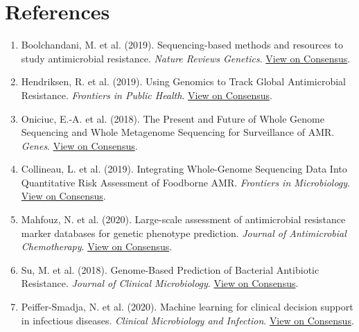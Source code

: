 \documentclass[11pt, letterpaper]{article}
\begin{document}
\section*{References}

\begin{enumerate}[leftmargin=*]
    \item \label{boolchandani2019} Boolchandani, M. et al. (2019). Sequencing-based methods and resources to study antimicrobial resistance. \textit{Nature Reviews Genetics}. \href{https://consensus.app/papers/details/435fbf72968c509e9a860a6c87d62175/?utm_source=unknown}{View on Consensus}.
    \item \label{hendriksen2019} Hendriksen, R. et al. (2019). Using Genomics to Track Global Antimicrobial Resistance. \textit{Frontiers in Public Health}. \href{https://consensus.app/papers/details/63ca2e3f2d9351809e2a67a5125cb606/?utm_source=unknown}{View on Consensus}.
    \item \label{oniciuc2018} Oniciuc, E.-A. et al. (2018). The Present and Future of Whole Genome Sequencing and Whole Metagenome Sequencing for Surveillance of AMR. \textit{Genes}. \href{https://consensus.app/papers/details/05f276609d5255abb0f4d6afd48851b5/?utm_source=unknown}{View on Consensus}.
    \item \label{collineau2019} Collineau, L. et al. (2019). Integrating Whole-Genome Sequencing Data Into Quantitative Risk Assessment of Foodborne AMR. \textit{Frontiers in Microbiology}. \href{https://consensus.app/papers/details/933edec6750e535fa356054fabf4c17f/?utm_source=unknown}{View on Consensus}.
    \item \label{mahfouz2020} Mahfouz, N. et al. (2020). Large-scale assessment of antimicrobial resistance marker databases for genetic phenotype prediction. \textit{Journal of Antimicrobial Chemotherapy}. \href{https://consensus.app/papers/details/656f5d8c9ae5558e8d3abbb81aaeff63/?utm_source=unknown}{View on Consensus}.
    \item \label{su2018} Su, M. et al. (2018). Genome-Based Prediction of Bacterial Antibiotic Resistance. \textit{Journal of Clinical Microbiology}. \href{https://consensus.app/papers/details/06e5710440fa5f90825a2a79cd48ffc6/?utm_source=unknown}{View on Consensus}.
    \item \label{peiffer2020} Peiffer-Smadja, N. et al. (2020). Machine learning for clinical decision support in infectious diseases. \textit{Clinical Microbiology and Infection}. \href{https://consensus.app/papers/details/72fce91a95125f52a36c655e1406d4e9/?utm_source=unknown}{View on Consensus}.

\end{enumerate}
\end{document}
